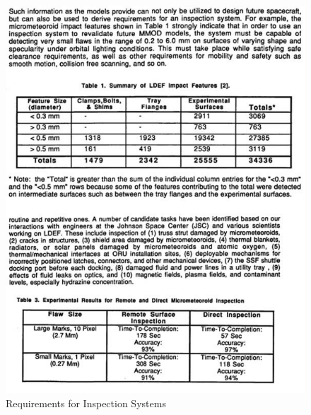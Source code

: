 \begin{figure}[H]
\centering
\includegraphics[scale=1]{Apppic/inspect}
\caption[Requirements for Inspection Systems]{Requirements for Inspection Systems \cite{NASAinspect_Hayati}}
\end{figure}
